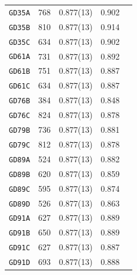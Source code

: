 \begin{table}
\begin{center}
\begin{tabular}{lcccc}
		\texttt{GD35A}	&	768 	&	0.877(13)	&	0.902   	&		\\
		\texttt{GD35B}	&	810 	&	0.877(13)	&	0.914   	&		\\
		\texttt{GD35C}	&	634 	&	0.877(13)	&	0.902   	&		\\
		\texttt{GD61A}	&	731 	&	0.877(13)	&	0.892   	&		\\
		\texttt{GD61B}	&	751 	&	0.877(13)	&	0.887   	&		\\
		\texttt{GD61C}	&	634 	&	0.877(13)	&	0.887   	&		\\
		\texttt{GD76B}	&	384 	&	0.877(13)	&	0.848   	&		\\
		\texttt{GD76C}	&	824 	&	0.877(13)	&	0.878   	&		\\
		\texttt{GD79B}	&	736 	&	0.877(13)	&	0.881   	&		\\
		\texttt{GD79C}	&	812 	&	0.877(13)	&	0.878   	&		\\
		\texttt{GD89A}	&	524 	&	0.877(13)	&	0.882   	&		\\
		\texttt{GD89B}	&	620 	&	0.877(13)	&	0.859   	&		\\
		\texttt{GD89C}	&	595 	&	0.877(13)	&	0.874   	&		\\
		\texttt{GD89D}	&	526 	&	0.877(13)	&	0.863   	&		\\
		\texttt{GD91A}	&	627 	&	0.877(13)	&	0.889   	&		\\
		\texttt{GD91B}	&	650 	&	0.877(13)	&	0.889   	&		\\
		\texttt{GD91C}	&	627 	&	0.877(13)	&	0.887   	&		\\
		\texttt{GD91D}	&	693 	&	0.877(13)	&	0.888   	&		\\
		\bottomrule
	\end{tabular}
	\end{center}
\end{table}
